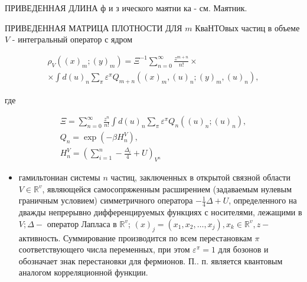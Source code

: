 \documentclass[10pt]{article}
\begin{document}
ПРИВЕДЕННАЯ ДЛИНА ф и з ического маятни ка - см. Маятник.



ПРИВЕДЕННАЯ МАТРИЦА ПЛОТНОСТИ ДЛЯ $m$ КваНТОвых частиц в объеме $V$ - интегральный оператор с ядром



\[

\begin{gathered}

\rho_{V}\left((x)_{m} ;(y)_{m}\right)=\Xi^{-1} \sum_{n=0}^{\infty} \frac{z^{m+n}}{n !} \times \\

\times \int d(u)_{n} \sum_{\pi} \varepsilon^{\pi} Q_{m+n}\left((x)_{m},(u)_{n} ;(y)_{m},(u)_{n}\right),

\end{gathered}

\]



где



\[

\begin{gathered}

\Xi=\sum_{n=0}^{\infty} \frac{z^{n}}{n !} \int d(u)_{n} \sum_{\pi} \varepsilon^{\pi} Q_{n}\left((u)_{n} ;(u)_{n}\right), \\

Q_{n}=\exp \left(-\beta H_{n}^{V}\right), \\

H_{n}^{V}=\left(\sum_{i=1}^{n}-\frac{\Delta_{i}}{4}+U\right)_{V^{n}}

\end{gathered}

\]



\begin{itemize}

  \item гамильтониан системы $n$ частиц, заключенных в открытой связной области $V \in \mathbb{R}^{v}$, являющейся самосопряженным расширением (задаваемым нулевым граничным условием) симметричного оператора $-\frac{1}{4} \Delta+U$, определенного на дважды непрерывно дифференцируемых функциях с носителями, лежащими в $V ; \Delta-$ оператор Лапласа в $\mathbb{R}^{v}$; $(x)_{j}=\left(x_{1}, x_{2}, \ldots, x_{j}\right), x_{k} \in \mathbb{R}^{v}, z-$ активность. Суммирование производится по всем перестановкам $\pi$ соответствующего числа переменных, при этом $\varepsilon^{\pi}=1$ для бозонов и обозначает знак перестановки для фермионов. П.. п. является квантовым аналогом корреляционной функции.

\end{itemize}
\end{document}

